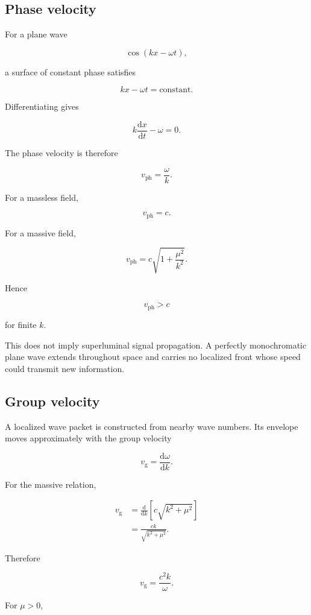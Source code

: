 \subsection{Phase velocity}

For a plane wave

\[
\cos(kx-\omega t),
\]

a surface of constant phase satisfies

\[
kx-\omega t=\text{constant}.
\]

Differentiating gives

\[
k\frac{\mathrm{d}x}{\mathrm{d}t}-\omega=0.
\]

The phase velocity is therefore

\[
\boxed{
v_{\mathrm{ph}}
=
\frac{\omega}{k}
}.
\]

For a massless field,

\[
\boxed{
v_{\mathrm{ph}}=c}.
\]

For a massive field,

\[
\boxed{
v_{\mathrm{ph}}
=
c
\sqrt{1+
\frac{\mu^{2}}{k^{2}}}
}.
\]

Hence

\[
v_{\mathrm{ph}}>c
\]

for finite \(k\).

This does not imply superluminal signal propagation. A perfectly monochromatic plane wave extends throughout space and carries no localized front whose speed could transmit new information.

\subsection{Group velocity}

A localized wave packet is constructed from nearby wave numbers. Its envelope moves approximately with the group velocity

\[
\boxed{
v_{\mathrm{g}}
=
\frac{\mathrm{d}\omega}{\mathrm{d}k}
}.
\]

For the massive relation,

\[
\begin{aligned}
v_{\mathrm{g}}
&=
\frac{\mathrm{d}}{\mathrm{d}k}
\left[
c\sqrt{k^{2}+\mu^{2}}
\right]\\
&=
\frac{ck}{\sqrt{k^{2}+\mu^{2}}}.
\end{aligned}
\]

Therefore

\[
\boxed{
v_{\mathrm{g}}
=
\frac{c^{2}k}{\omega}
}.
\]

For \(\mu>0\),

